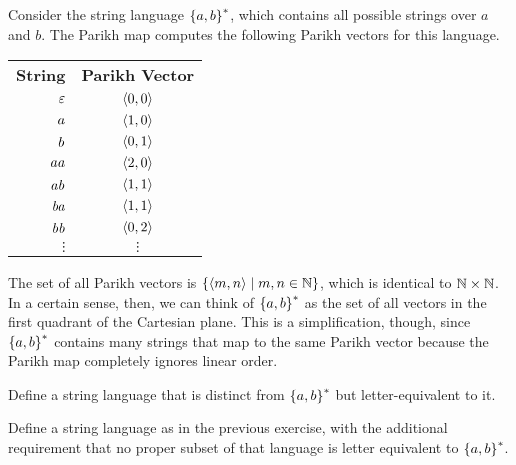 \begin{examplebox}
    Consider the string language $\left \{ a,b \right \}^*$, which contains all possible strings over $a$ and $b$.
    The Parikh map computes the following Parikh vectors for this language.
    \begin{center}
        \begin{tabular}{rc}
            \textbf{String} & \textbf{Parikh Vector}\\
            $\varepsilon$ & $\left \langle 0,0 \right \rangle $\\
            $\mathit{a}$ & $\left \langle 1,0 \right \rangle $\\
            $\mathit{b}$ & $\left \langle 0,1 \right \rangle $\\
            $\mathit{aa}$ & $\left \langle 2,0 \right \rangle $\\
            $\mathit{ab}$ & $\left \langle 1,1 \right \rangle $\\
            $\mathit{ba}$ & $\left \langle 1,1 \right \rangle $\\
            $\mathit{bb}$ & $\left \langle 0,2 \right \rangle $\\
            $\vdots$ & $\vdots$
        \end{tabular}
    \end{center}
    The set of all Parikh vectors is $\left \{  \left \langle m,n \right \rangle  \mid m,n \in \mathbb{N}  \right \}$, which is identical to $\mathbb{N} \times \mathbb{N}$.
    In a certain sense, then, we can think of $\left \{ a,b \right \}^*$ as the set of all vectors in the first quadrant of the Cartesian plane.
    This is a simplification, though, since $\left \{ a,b \right \}^*$ contains many strings that map to the same Parikh vector because the Parikh map completely ignores linear order.
\end{examplebox}
%
\begin{exercise}
    Define a string language that is distinct from $\left \{ a,b \right \}^*$ but letter-equivalent to it.
\end{exercise}
%
\begin{exercise}
    Define a string language as in the previous exercise, with the additional requirement that no proper subset of that language is letter equivalent to $\left \{ a,b \right \}^*$. 
\end{exercise}

